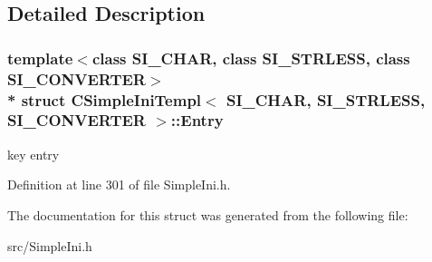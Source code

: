 \subsection{Detailed Description}
\subsubsection*{template$<$class S\+I\+\_\+\+C\+H\+AR, class S\+I\+\_\+\+S\+T\+R\+L\+E\+SS, class S\+I\+\_\+\+C\+O\+N\+V\+E\+R\+T\+ER$>$\\*
struct C\+Simple\+Ini\+Templ$<$ S\+I\+\_\+\+C\+H\+A\+R, S\+I\+\_\+\+S\+T\+R\+L\+E\+S\+S, S\+I\+\_\+\+C\+O\+N\+V\+E\+R\+T\+E\+R $>$\+::\+Entry}

key entry 

Definition at line 301 of file Simple\+Ini.\+h.



The documentation for this struct was generated from the following file\+:\begin{DoxyCompactItemize}
\item 
src/Simple\+Ini.\+h\end{DoxyCompactItemize}
